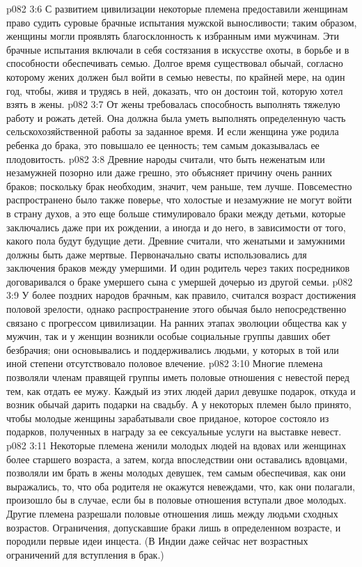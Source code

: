 \vs p082 3:6 С развитием цивилизации некоторые племена предоставили женщинам право судить суровые брачные испытания мужской выносливости; таким образом, женщины могли проявлять благосклонность к избранным ими мужчинам. Эти брачные испытания включали в себя состязания в искусстве охоты, в борьбе и в способности обеспечивать семью. Долгое время существовал обычай, согласно которому жених должен был войти в семью невесты, по крайней мере, на один год, чтобы, живя и трудясь в ней, доказать, что он достоин той, которую хотел взять в жены.
\vs p082 3:7 От жены требовалась способность выполнять тяжелую работу и рожать детей. Она должна была уметь выполнять определенную часть сельскохозяйственной работы за заданное время. И если женщина уже родила ребенка до брака, это повышало ее ценность; тем самым доказывалась ее плодовитость.
\vs p082 3:8 \pc Древние народы считали, что быть неженатым или незамужней позорно или даже грешно, это объясняет причину очень ранних браков; поскольку брак необходим, значит, чем раньше, тем лучше. Повсеместно распространено было также поверье, что холостые и незамужние не могут войти в страну духов, а это еще больше стимулировало браки между детьми, которые заключались даже при их рождении, а иногда и до него, в зависимости от того, какого пола будут будущие дети. Древние считали, что женатыми и замужними должны быть даже мертвые. Первоначально сваты использовались для заключения браков между умершими. И один родитель через таких посредников договаривался о браке умершего сына с умершей дочерью из другой семьи.
\vs p082 3:9 У более поздних народов брачным, как правило, считался возраст достижения половой зрелости, однако распространение этого обычая было непосредственно связано с прогрессом цивилизации. На ранних этапах эволюции общества как у мужчин, так и у женщин возникли особые социальные группы давших обет безбрачия; они основывались и поддерживались людьми, у которых в той или иной степени отсутствовало половое влечение.
\vs p082 3:10 Многие племена позволяли членам правящей группы иметь половые отношения с невестой перед тем, как отдать ее мужу. Каждый из этих людей дарил девушке подарок, откуда и возник обычай дарить подарки на свадьбу. А у некоторых племен было принято, чтобы молодые женщины зарабатывали свое приданое, которое состояло из подарков, полученных в награду за ее сексуальные услуги на выставке невест.
\vs p082 3:11 Некоторые племена женили молодых людей на вдовах или женщинах более старшего возраста, а затем, когда впоследствии они оставались вдовцами, позволяли им брать в жены молодых девушек, тем самым обеспечивая, как они выражались, то, что оба родителя не окажутся невеждами, что, как они полагали, произошло бы в случае, если бы в половые отношения вступали двое молодых. Другие племена разрешали половые отношения лишь между людьми сходных возрастов. Ограничения, допускавшие браки лишь в определенном возрасте, и породили первые идеи инцеста. (В Индии даже сейчас нет возрастных ограничений для вступления в брак.)
